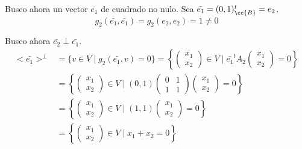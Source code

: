 \begin{ejercicio}
\begin{enumerate}
        Busco ahora un vector $\bar{e_1}$ de cuadrado no nulo. Sea $\bar{e_1} = (0,1)^t_{\cc{B}} = e_2$.
        \begin{equation*}
            g_2(\bar{e_1}, \bar{e_1}) =
            g_2(e_2, e_2) = 1 \neq 0
        \end{equation*}

        Busco ahora $\bar{e_2} \perp \bar{e_1}$.
        \begin{equation*}\begin{split}
            <\bar{e_1}>^\perp &= \{v \in V \mid g_2(\bar{e_1},v) = 0\} 
            = \left\{ \left(\begin{array}{c}
                 x_1 \\ x_2
            \end{array} \right) \in V \mid \bar{e_1}^t A_2
            \left(\begin{array}{c}
                 x_1 \\ x_2
            \end{array} \right) = 0\right\} \\
            &= \left\{ \left(\begin{array}{c}
                 x_1 \\ x_2
            \end{array} \right) \in V \mid (0,1)\left(\begin{array}{cc}
                0 & 1 \\
                1 & 1
            \end{array} \right) 
            \left(\begin{array}{c}
                 x_1 \\ x_2
            \end{array} \right) = 0\right\} \\
            &= \left\{ \left(\begin{array}{c}
                 x_1 \\ x_2
            \end{array} \right) \in V \mid (1,1)
            \left(\begin{array}{c}
                 x_1 \\ x_2
            \end{array} \right) = 0\right\} \\
            &= \left\{ \left(\begin{array}{c}
                 x_1 \\ x_2
            \end{array} \right) \in V \mid x_1+x_2 = 0\right\}

\end{split}
\end{equation*}
\end{enumerate}
\end{ejercicio}

